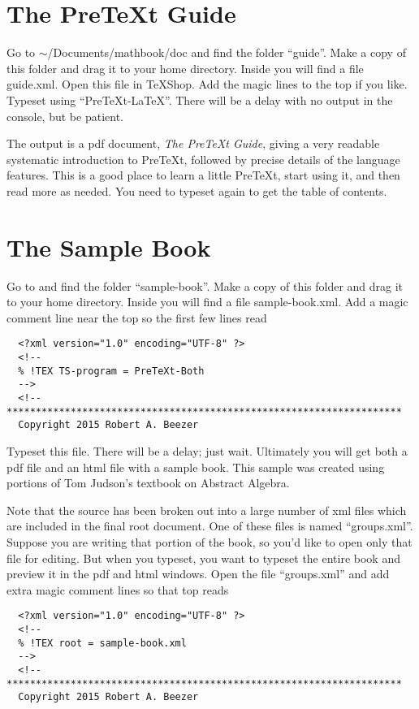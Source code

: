 \documentclass[11pt, oneside]{article}   	%
\begin{document}
\section{The PreTeXt Guide}

Go to $\sim$/Documents/mathbook/doc and find the folder ``guide''. Make a copy of this folder and drag it to your home directory. Inside you will find a file guide.xml. Open this file in TeXShop. Add the  magic lines to the top if you like. Typeset using
``PreTeXt-LaTeX''. There will be a delay with no output in the console, but be patient. 

The output is a  pdf document, {\em The PreTeXt Guide}, giving a very readable systematic introduction to PreTeXt, followed by precise details of the language features. This is a good place to learn a little PreTeXt, start using it, and then read more as needed. You need to typeset again to get the table of contents. 

\section{The Sample Book}

Go to  and find the folder “sample-book”. Make a copy of this folder and drag it to your home directory. Inside you will find a file sample-book.xml. Add a magic comment line near the top so the first few lines read
\begin{verbatim}
  <?xml version="1.0" encoding="UTF-8" ?>
  <!--
  % !TEX TS-program = PreTeXt-Both
  -->
  <!--********************************************************************
  Copyright 2015 Robert A. Beezer
\end{verbatim}
Typeset this file. There will be a delay; just wait. Ultimately you will get both a pdf file and an html file with a sample book. This sample was created using portions of Tom Judson's textbook on Abstract Algebra.

Note that the source has been broken out into a large number of xml files which are included in the final root document. One of these files is named ``groups.xml''. Suppose you are writing that portion of the book, so you'd like to open only that file for editing. But when you typeset, you want to typeset the entire book and preview it in the pdf and html windows. Open the file ``groups.xml'' and add extra magic comment lines so that top reads
\begin{verbatim}
  <?xml version="1.0" encoding="UTF-8" ?>
  <!--
  % !TEX root = sample-book.xml
  -->
  <!--********************************************************************
  Copyright 2015 Robert A. Beezer
\end{verbatim}
\end{document}
